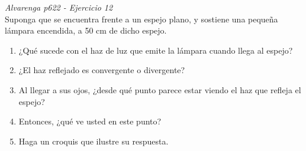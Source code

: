 \textit{Alvarenga p622 - Ejercicio 12}\\Suponga que se encuentra frente a un espejo plano, y sostiene una pequeña lámpara encendida, a 50 cm de dicho espejo.
\begin{enumerate}
    \item ¿Qué sucede con el haz de luz que emite la lámpara cuando llega al espejo?
    \item ¿El haz reflejado es convergente o divergente?
    \item Al llegar a sus ojos, ¿desde qué punto parece estar viendo el haz que refleja el espejo?
    \item Entonces, ¿qué ve usted en este punto?
    \item Haga un croquis que ilustre su respuesta.
\end{enumerate}